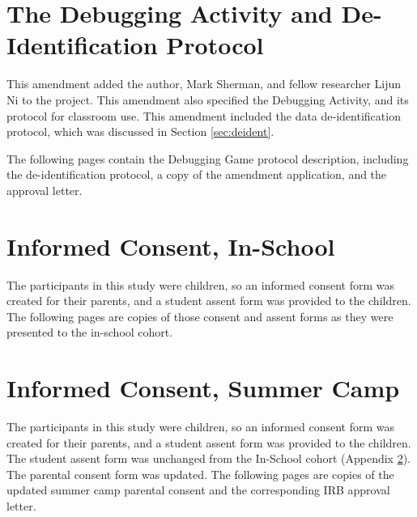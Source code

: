 % 
% 

\section{The Debugging Activity and De-Identification Protocol}
This amendment added the author, Mark Sherman, and fellow researcher Lijun Ni to the project. This amendment also specified the Debugging Activity, and its protocol for classroom use. This amendment included the data de-identification protocol, which was discussed in Section \ref{sec:deident}.

The following pages contain the Debugging Game protocol description, including the de-identification protocol, a copy of the amendment application, and the approval letter.


%

\label{IRB:deident}



% 
% 

\section{Informed Consent, In-School}
\label{sec:icf:school}
The participants in this study were children, so an informed consent form was created for their parents, and a student assent form was provided to the children. The following pages are copies of those consent and assent forms as they were presented to the in-school cohort.




\section{Informed Consent, Summer Camp}
\label{sec:icf:camp}
The participants in this study were children, so an informed consent form was created for their parents, and a student assent form was provided to the children. The student assent form was unchanged from the In-School cohort (Appendix \ref{sec:icf:school}). The parental consent form was updated. The following pages are copies of the updated summer camp parental consent and the corresponding IRB approval letter.

